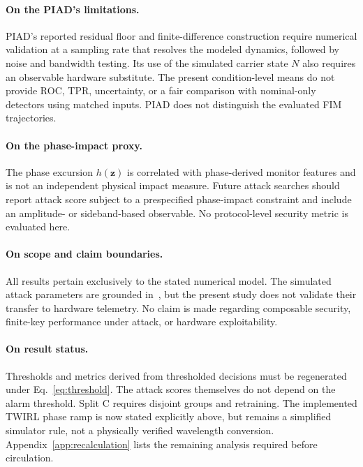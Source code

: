 \documentclass[journal,twocolumn]{IEEEtran}
\newcommand{\vz}{\mathbf{z}}
\newcommand{\hobs}{h(\vz)}
\begin{document}
\paragraph{On the PIAD's limitations.}
PIAD's reported residual floor and finite-difference construction require numerical
validation at a sampling rate that resolves the modeled dynamics, followed by noise
and bandwidth testing. Its use of the simulated carrier state $N$ also requires an
observable hardware substitute. The present condition-level means do not provide ROC,
TPR, uncertainty, or a fair comparison with nominal-only detectors using matched
inputs. PIAD does not distinguish the evaluated FIM trajectories.

\paragraph{On the phase-impact proxy.}
The phase excursion $\hobs$ is correlated with phase-derived monitor features and is
not an independent physical impact measure. Future attack searches should report
attack score subject to a prespecified phase-impact constraint and include an
amplitude- or sideband-based observable. No protocol-level security metric is
evaluated here.

\paragraph{On scope and claim boundaries.}
All results pertain exclusively to the stated numerical model. The simulated attack
parameters are grounded in~\cite{juarez2026,basepaper}, but the present study does not
validate their transfer to hardware telemetry. No claim is made regarding composable
security, finite-key performance under attack, or hardware exploitability.

\paragraph{On result status.}
Thresholds and metrics derived from thresholded decisions must be regenerated under
Eq.~\eqref{eq:threshold}. The attack scores themselves do not depend on the alarm
threshold. Split C requires disjoint groups and retraining. The implemented TWIRL
phase ramp is now stated explicitly above, but remains a simplified simulator rule,
not a physically verified wavelength conversion. Appendix~\ref{app:recalculation}
lists the remaining analysis required before circulation.

\end{document}
